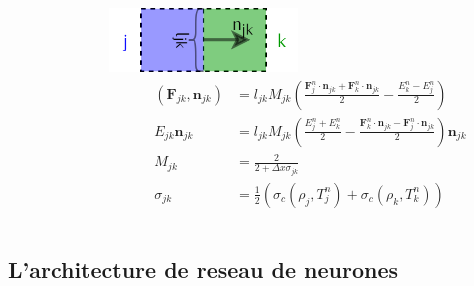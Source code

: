 \documentclass[xcolor=dvipsnames]{beamer} %
\newcommand{\bvec}[1]{\mathbf{#1}}
\begin{document}
\begin{frame}
\begin{columns}
\begin{column}{0.6\textwidth}
    \end{column}
    \begin{column}{0.4\textwidth}
       \begin{center}
        \includegraphics[width=5cm]{Interaction2D}       
        \begingroup
        \tiny
        \begin{align*}
          \left(\bvec F_{jk}, \bvec n_{jk} \right) &= l_{jk} M_{jk} \left( \frac{\bvec F_j^n \cdot \bvec n_{jk} + \bvec F_k^n \cdot \bvec n_{jk}}{2} - \frac{E_k^n - E_j^n}{2} \right) \\
          E_{jk} \bvec n_{jk} &= l_{jk} M_{jk} \left( \frac{E_j^n + E_k^n}{2} - \frac{\bvec F_k^n \cdot \bvec n_{jk} - \bvec F_j^n \cdot \bvec n_{jk}}{2} \right) \bvec n_{jk} \\
          M_{jk} &= \frac{2}{2 + \Delta x \sigma_{jk}}  \\
          \sigma_{jk} &= \frac{1}{2} \left( \sigma_c(\rho_j,T_j^n) + \sigma_c(\rho_k,T_k^n) \right)
         \end{align*}
        \endgroup
       \end{center}
    \end{column}
   \end{columns}
\end{frame}

\subsection{L'architecture de reseau de neurones}
\end{document}
